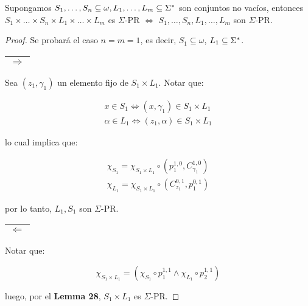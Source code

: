   \begin{lemma}
    \PN Supongamos $S_{1}, \dotsc, S_{n} \subseteq \omega, L_{1}, \dotsc, L_{m} \subseteq \Sigma^{\ast}$ son conjuntos no
    vacíos, entonces $S_{1} \times \dotsc \times S_{n} \times L_{1} \times \dotsc \times L_{m}$ es $\Sigma$-PR
    $\Leftrightarrow$ $S_{1}, \dotsc, S_{n}, L_{1}, \dotsc, L_{m}$ son $\Sigma$-PR.
  \end{lemma}
  \begin{proof}
    \PN Se probará el caso $n = m = 1$, es decir, $S_{1} \subseteq \omega$, $L_{1} \subseteq \Sigma^{\ast}$.

    \vspace{3mm}
    \PN \begin{tabular}{|c|} \hline $\Rightarrow$ \\\hline \end{tabular} Sea $(z_{1}, \gamma_{1})$ un elemento fijo de
    $S_{1} \times L_{1}$. Notar que:

    \begin{eqnarray*}
      x \in S_{1} \Leftrightarrow (x, \gamma_{1}) \in S_{1} \times L_{1} \\
      \alpha \in L_{1} \Leftrightarrow (z_{1}, \alpha) \in S_{1} \times L_{1}
    \end{eqnarray*}

    \PN lo cual implica que:

    \begin{eqnarray*}
      \chi_{S_{1}} = \chi_{S_{1} \times L_{1}} \circ \left(p_{1}^{1,0}, C_{\gamma_{1}}^{1,0}\right) \\
      \chi_{L_{1}} = \chi_{S_{1} \times L_{1}} \circ \left(C_{z_{1}}^{0,1}, p_{1}^{0,1}\right)
    \end{eqnarray*}

    \PN por lo tanto, $L_{1}, S_{1}$ son $\Sigma$-PR.

    \vspace{3mm}
    \PN \begin{tabular}{|c|} \hline $\Leftarrow$\\\hline \end{tabular} Notar que:

    \[
      \chi_{S_{1} \times L_{1}} = \left(\chi_{S_{1}} \circ p_{1}^{1,1} \wedge \chi_{L_{1}} \circ p_{2}^{1,1} \right)
    \]

    \PN luego, por el \textbf{Lemma 28}, $S_{1} \times L_{1}$ es $\Sigma$-PR.
  \end{proof}

